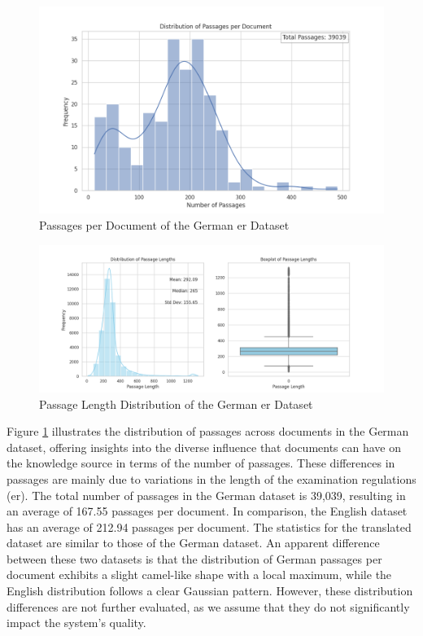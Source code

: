 \begin{figure}
    \centering
    \includegraphics[width=\textwidth]{Grafiken/Statistiken/IndexGerman_Passages_Distribution.png}
    \caption{Passages per Document of the German \gls{er} Dataset}
    \label{fig:er-german-passage-document}
\end{figure}

\begin{figure}
    \centering
    \includegraphics[width=\textwidth]{Grafiken/Statistiken/IndexGerman_Passage_Length_Statistics.png}
    \caption{Passage Length Distribution of the German \gls{er} Dataset}
    \label{fig:er-german-passage-length}
\end{figure}
Figure \ref{fig:er-german-passage-document} illustrates the distribution of passages across documents in the German dataset, offering insights into the diverse influence that documents can have on the knowledge source in terms of the number of passages. These differences in passages are mainly due to variations in the length of the examination regulations (\gls{er}). The total number of passages in the German dataset is 39,039, resulting in an average of 167.55 passages per document. In comparison, the English dataset has an average of 212.94 passages per document. The statistics for the translated dataset are similar to those of the German dataset. An apparent difference between these two datasets is that the distribution of German passages per document exhibits a slight camel-like shape with a local maximum, while the English distribution follows a clear Gaussian pattern. However, these distribution differences are not further evaluated, as we assume that they do not significantly impact the system's quality.

